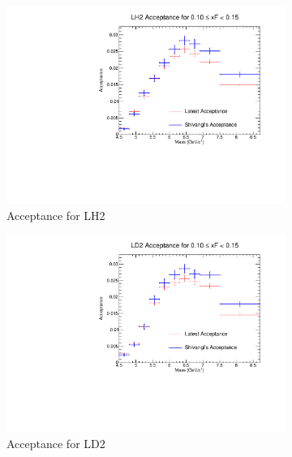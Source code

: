 \documentclass[11pt]{article}
\begin{document}
\begin{figure}[p]
    \centering
    \begin{subfigure}[b]{0.48\textwidth}
       \includegraphics[width=\linewidth]{./acceptancePlots/LH2_acceptance_xF_bin_2.pdf}
       \caption{Acceptance for LH2}
    \end{subfigure}\hfill
    \begin{subfigure}[b]{0.48\textwidth}
       \includegraphics[width=\linewidth]{./acceptancePlots/LD2_acceptance_xF_bin_2.pdf}
       \caption{Acceptance for LD2}
    \end{subfigure}
    \begin{subfigure}[b]{0.48\textwidth}

\end{subfigure}
\end{figure}
\end{document}
